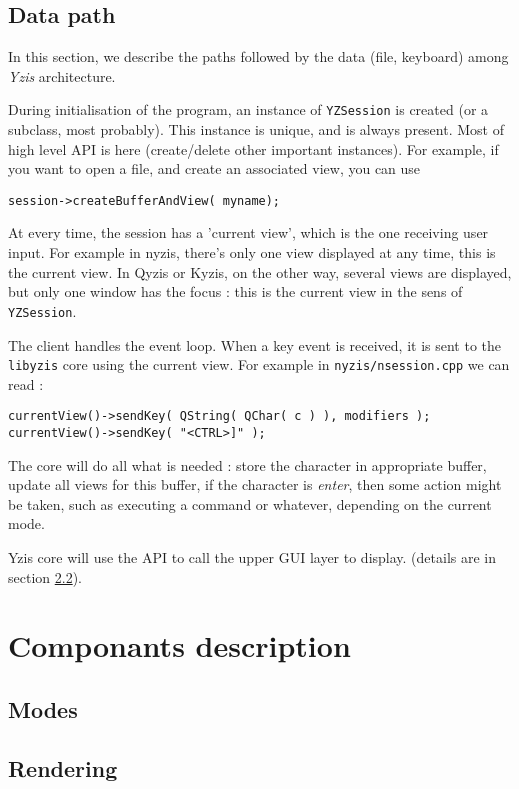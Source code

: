 \documentclass[a4paper,12pt]{report}
\begin{document}
\section{Data path}
In this section, we describe the paths followed by the data (file,
keyboard) among \emph{Yzis} architecture.

During initialisation of the program, an instance of \verb+YZSession+ is
created (or a subclass, most probably). This instance is unique, and is
always present. Most of high level API is here (create/delete other
important instances).
For example, if you want to open a file, and create an associated view, you
can use
\begin{verbatim}
session->createBufferAndView( myname);
\end{verbatim}

At every time, the session has a 'current view', which is the one receiving
user input. For example in nyzis, there's only one view displayed at any
time, this is the current view. In Qyzis or Kyzis, on the other way,
several views are displayed, but only one window has the focus : this is
the current view in the sens of \verb+YZSession+.

The client handles the event loop. When a key event is received, it is sent
to the \verb+libyzis+ core using the current view. For example in
\verb+nyzis/nsession.cpp+ we can read :
\begin{verbatim}
currentView()->sendKey( QString( QChar( c ) ), modifiers );
currentView()->sendKey( "<CTRL>]" );
\end{verbatim}

The core will do all what is needed : store the character in appropriate
buffer, update all views for this buffer, if the character is \emph{enter},
then some action might be taken, such as executing a command or whatever,
depending on the current mode.

Yzis core will use the API to call the upper GUI layer to display. (details
are in section \ref{rendering}).



\chapter{Componants description}

\section{Modes}


\section{Rendering}
\label{rendering}
\end{document}
